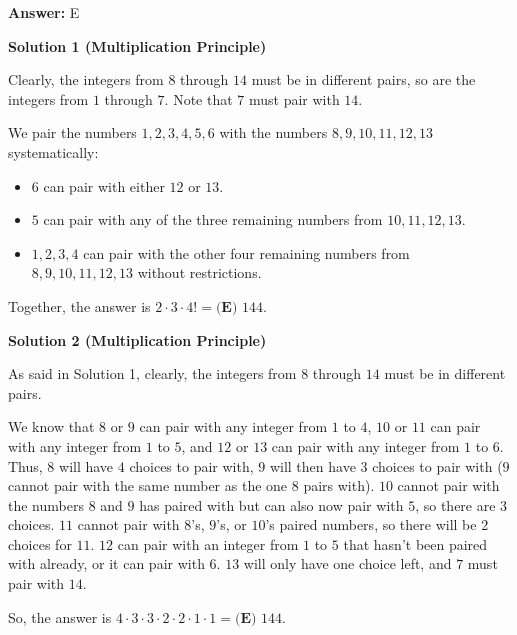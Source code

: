 \begin{enumerate}
 \textbf{Answer: }E



\textbf{Solution 1 (Multiplication Principle)}

Clearly, the integers from $8$ through $14$ must be in different pairs, so are the integers from $1$ through $7.$ Note that $7$ must pair with $14.$

 We pair the numbers $1,2,3,4,5,6$ with the numbers $8,9,10,11,12,13$ systematically:

 
            \begin{itemize}
        \item $6$ can pair with either $12$ or $13.$
            \end{itemize}
            
            \begin{itemize}
        \item $5$ can pair with any of the three remaining numbers from $10,11,12,13.$
            \end{itemize}
            
            \begin{itemize}
        \item $1,2,3,4$ can pair with the other four remaining numbers from $8,9,10,11,12,13$ without restrictions.
            \end{itemize}
            Together, the answer is $2\cdot3\cdot4!=\boxed{\textbf{(E) } 144}.$




\textbf{Solution 2 (Multiplication Principle)}

As said in Solution 1, clearly, the integers from $8$ through $14$ must be in different pairs.

 We know that $8$ or $9$ can pair with any integer from $1$ to $4$, $10$ or $11$ can pair with any integer from $1$ to $5$, and $12$ or $13$ can pair with any integer from $1$ to $6$. Thus, $8$ will have $4$ choices to pair with, $9$ will then have $3$ choices to pair with ($9$ cannot pair with the same number as the one $8$ pairs with). $10$ cannot pair with the numbers $8$ and $9$ has paired with but can also now pair with $5$, so there are $3$ choices. $11$ cannot pair with $8$'s, $9$'s, or $10$'s paired numbers, so there will be $2$ choices for $11$. $12$ can pair with an integer from $1$ to $5$ that hasn't been paired with already, or it can pair with $6$. $13$ will only have one choice left, and $7$ must pair with $14$.

 So, the answer is $4\cdot3\cdot3\cdot2\cdot2\cdot1\cdot1=\boxed{\textbf{(E) } 144}.$





\end{enumerate}
